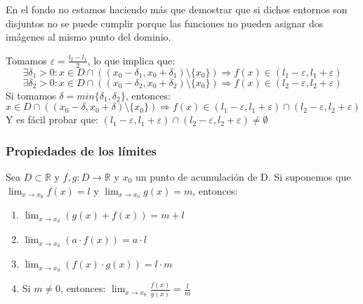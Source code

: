 \documentclass[10pt,a4paper,openright]{book}
\begin{document}
\begin{enumerate}
En el fondo no estamos haciendo más que demostrar que si dichos entornos son disjuntos no se puede cumplir porque las funciones no pueden asignar dos imágenes al mismo punto del dominio.

Tomamos $\varepsilon=\frac{l_2-l_1}{2}$, lo que implica que:
$$\exists \delta_1>0: x\in D\cap \left((x_0-\delta_1, x_0+\delta_1)\mbox{\textbackslash}\{x_0\}\right) \Rightarrow f(x)\in (l_1-\varepsilon, l_1+\varepsilon)$$
$$\exists \delta_2>0: x\in D\cap \left((x_0-\delta_2, x_0+\delta_2)\mbox{\textbackslash}\{x_0\}\right) \Rightarrow f(x)\in (l_2-\varepsilon, l_2+\varepsilon)$$
Si tomamos $\delta=min\{\delta_1, \delta_2\}$, entonces:
$$x\in D\cap \left((x_0-\delta, x_0+\delta)\mbox{\textbackslash}\{x_0\}\right) \Rightarrow f(x)\in (l_1-\varepsilon, l_1+\varepsilon)\cap (l_2-\varepsilon, l_2+\varepsilon)$$
Y es fácil probar que: $(l_1-\varepsilon, l_1+\varepsilon)\cap (l_2-\varepsilon, l_2+\varepsilon)\neq \emptyset$
\end{enumerate}

\subsubsection*{Propiedades de los límites}
Sea $D\subset \mathbb R$ y $f,g: D\longrightarrow \mathbb R$ y $x_0$ un punto de acumulación de D. Si suponemos que $\lim_{x\rightarrow x_0}f(x)=l$ y $\lim_{x\rightarrow x_0}g(x)=m$, entonces:
\begin{enumerate}
\item $\lim_{x\rightarrow x_0}(g(x)+f(x))=m+l$
\item $\lim_{x\rightarrow x_0}(a\cdot f(x))=a\cdot l$
\item $\lim_{x\rightarrow x_0}(f(x)\cdot g(x))=l\cdot m$
\item Si $m\neq 0$, entonces: $\lim_{x\rightarrow x_0}\frac{f(x)}{g(x)}=\frac{l}{m}$
\end{enumerate}
\end{document}

